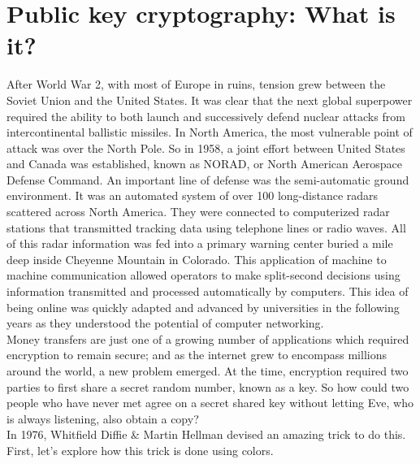 \documentclass{report}
\begin{document}
\section{Public key cryptography: What is it?}

After World War 2, with most of Europe in ruins, tension grew between the Soviet Union and the United States. It was clear that the next global superpower required the ability to both launch and successively defend nuclear attacks from intercontinental ballistic missiles. In North America, the most vulnerable point of attack was over the North Pole. So in 1958, a joint effort between United States and Canada was established, known as NORAD, or North American Aerospace Defense Command. An important line of defense was the semi-automatic ground environment. It was an automated system of over 100 long-distance radars scattered across North America. They were connected to computerized radar stations that transmitted tracking data using telephone lines or radio waves. All of this radar information was fed into a primary warning center buried a mile deep inside Cheyenne Mountain in Colorado. This application of machine to machine communication allowed operators to make split-second decisions using information transmitted and processed automatically by computers. This idea of being online was quickly adapted and advanced by universities in the following years as they understood the potential of computer networking.\\
Money transfers are just one of a growing number of applications which required encryption to remain secure; and as the internet grew to encompass millions around the world, a new problem emerged. At the time, encryption required two parties to first share a secret random number, known as a key. So how could two people who have never met agree on a secret shared key without letting Eve, who is always listening, also obtain a copy? \\
In 1976, Whitfield Diffie \& Martin Hellman devised an amazing trick to do this. First, let's explore how this trick is done using colors.  
\end{document}
